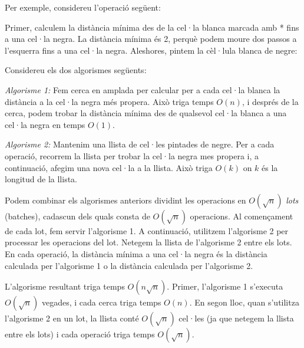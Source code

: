 Per exemple, considereu l'operació següent:


\begin{center}
\end{center}


Primer, calculem la distància mínima des de la cel·la blanca marcada
amb * fins a una cel·la negra. La distància mínima és 2, perquè podem
moure dos passos a l'esquerra fins a una cel·la negra. Aleshores,
pintem la cèl·lula blanca de negre:


\begin{center}
\end{center}


Considereu els dos algorismes següents:

\emph{Algorisme 1:} Fem cerca en amplada per calcular per a cada
cel·la blanca la distància a la cel·la negra més propera. Això triga
temps $O(n)$, i després de la cerca, podem trobar la distància mínima
des de qualsevol cel·la blanca a una cel·la negra en temps $O(1)$.

\emph{Algorisme 2:} Mantenim una llista de cel·les pintades de
negre. Per a cada operació, recorrem la llista per trobar la cel·la
negra mes propera i, a continuació, afegim una nova cel·la a la
llista. Això triga $O(k)$ on $k$ és la longitud de la llista.

Podem combinar els algorismes anteriors dividint les operacions en
$O(\sqrt n)$ \emph{lots} (batches), cadascun dels quals consta de
$O(\sqrt n)$ operacions. Al començament de cada lot, fem servir
l'algorisme 1. A continuació, utilitzem l'algorisme 2 per processar
les operacions del lot. Netegem la llista de l'algorisme 2 entre els
lots. En cada operació, la distància mínima a una cel·la negra és la
distància calculada per l'algorisme 1 o la distància calculada per
l'algorisme 2.

L'algorisme resultant triga temps $O(n\sqrt n)$. Primer, l'algorisme 1
s'executa $O(\sqrt n)$ vegades, i cada cerca triga temps $O(n)$. En
segon lloc, quan s'utilitza l'algorisme 2 en un lot, la llista conté
$O(\sqrt n)$ cel·les (ja que netegem la llista entre els lots) i cada
operació triga temps $O(\sqrt n)$.

